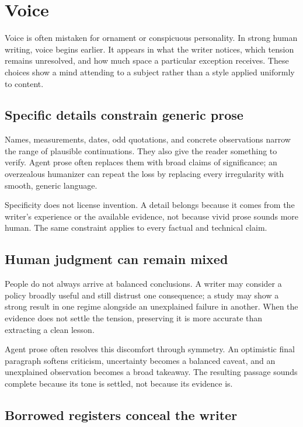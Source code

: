 \section{Voice}
\label{sec:voice}

Voice is often mistaken for ornament or conspicuous personality. In strong
human writing, voice begins earlier. It appears in what the writer notices,
which tension remains unresolved, and how much space a particular exception
receives. These choices show a mind attending to a subject rather than a style
applied uniformly to content.

\subsection{Specific details constrain generic prose}

Names, measurements, dates, odd quotations, and concrete observations narrow
the range of plausible continuations. They also give the reader something to
verify. Agent prose often replaces them with broad claims of significance; an
overzealous humanizer can repeat the loss by replacing every irregularity with
smooth, generic language.

Specificity does not license invention. A detail belongs because it comes from
the writer's experience or the available evidence, not because vivid prose
sounds more human. The same constraint applies to every factual and technical
claim.

\subsection{Human judgment can remain mixed}

People do not always arrive at balanced conclusions. A writer may consider a
policy broadly useful and still distrust one consequence; a study may show a
strong result in one regime alongside an unexplained failure in another. When
the evidence does not settle the tension, preserving it is more accurate than
extracting a clean lesson.

Agent prose often resolves this discomfort through symmetry. An optimistic
final paragraph softens criticism, uncertainty becomes a balanced caveat, and
an unexplained observation becomes a broad takeaway. The resulting passage
sounds complete because its tone is settled, not because its evidence is.

\subsection{Borrowed registers conceal the writer}

